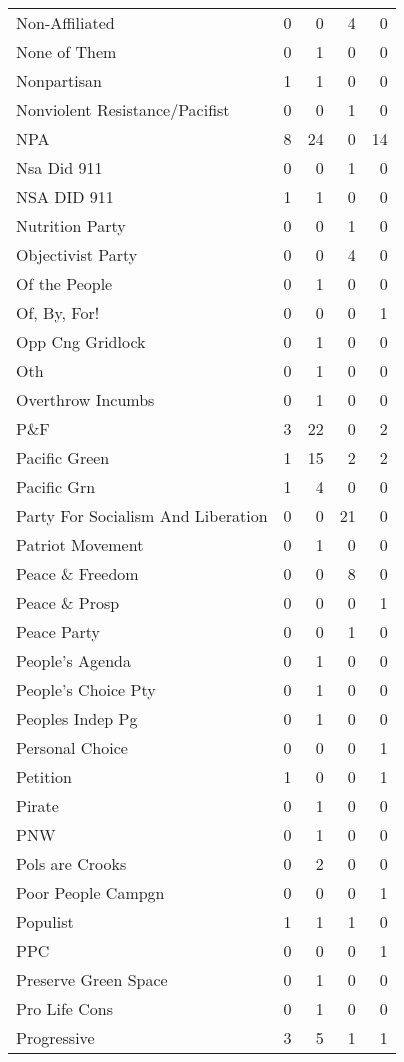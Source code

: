 \begin{supertabular}{lrrrr}
Non-Affiliated & 0 & 0 & 4 & 0\\
None of Them & 0 & 1 & 0 & 0\\
Nonpartisan & 1 & 1 & 0 & 0\\
Nonviolent Resistance/Pacifist & 0 & 0 & 1 & 0\\
NPA & 8 & 24 & 0 & 14\\
Nsa Did 911 & 0 & 0 & 1 & 0\\
NSA DID 911 & 1 & 1 & 0 & 0\\
Nutrition Party & 0 & 0 & 1 & 0\\
Objectivist Party & 0 & 0 & 4 & 0\\
Of the People & 0 & 1 & 0 & 0\\
Of, By, For! & 0 & 0 & 0 & 1\\
Opp Cng Gridlock & 0 & 1 & 0 & 0\\
Oth & 0 & 1 & 0 & 0\\
Overthrow Incumbs & 0 & 1 & 0 & 0\\
P\&F & 3 & 22 & 0 & 2\\
Pacific Green & 1 & 15 & 2 & 2\\
Pacific Grn & 1 & 4 & 0 & 0\\
Party For Socialism And Liberation & 0 & 0 & 21 & 0\\
Patriot Movement & 0 & 1 & 0 & 0\\
Peace \& Freedom & 0 & 0 & 8 & 0\\
Peace \& Prosp & 0 & 0 & 0 & 1\\
Peace Party & 0 & 0 & 1 & 0\\
People's Agenda & 0 & 1 & 0 & 0\\
People's Choice Pty & 0 & 1 & 0 & 0\\
Peoples Indep Pg & 0 & 1 & 0 & 0\\
Personal Choice & 0 & 0 & 0 & 1\\
Petition & 1 & 0 & 0 & 1\\
Pirate & 0 & 1 & 0 & 0\\
PNW & 0 & 1 & 0 & 0\\
Pols are Crooks & 0 & 2 & 0 & 0\\
Poor People Campgn & 0 & 0 & 0 & 1\\
Populist & 1 & 1 & 1 & 0\\
PPC & 0 & 0 & 0 & 1\\
Preserve Green Space & 0 & 1 & 0 & 0\\
Pro Life Cons & 0 & 1 & 0 & 0\\
Progressive & 3 & 5 & 1 & 1\\

\end{supertabular}
